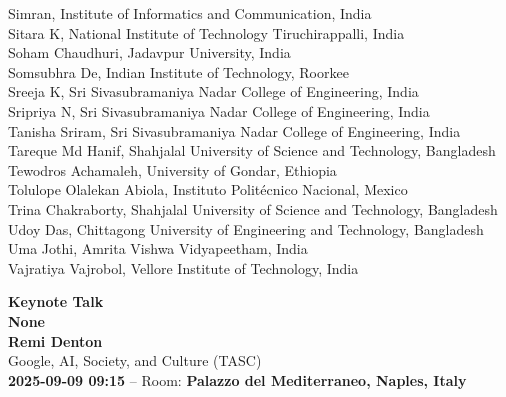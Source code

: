\documentclass[11pt,oneside]{book}
\begin{document}
\begin{description}
              Simran, Institute of Informatics and Communication, India\\
              Sitara K, National Institute of Technology Tiruchirappalli, India\\
              Soham Chaudhuri, Jadavpur University, India\\
              Somsubhra De, Indian Institute of Technology, Roorkee\\
              Sreeja K, Sri Sivasubramaniya Nadar College of Engineering, India\\
              Sripriya N, Sri Sivasubramaniya Nadar College of Engineering, India\\
              Tanisha Sriram, Sri Sivasubramaniya Nadar College of Engineering, India\\
              Tareque Md Hanif, Shahjalal University of Science and Technology, Bangladesh\\
              Tewodros Achamaleh, University of Gondar, Ethiopia\\
              Tolulope Olalekan Abiola, Instituto Politécnico Nacional, Mexico\\
              Trina Chakraborty, Shahjalal University of Science and Technology, Bangladesh\\
              Udoy Das, Chittagong University of Engineering and Technology, Bangladesh\\
              Uma Jothi, Amrita Vishwa Vidyapeetham, India\\
              Vajratiya Vajrobol, Vellore Institute of Technology, India\\
\end{description}
\newpage

  \begin{center}
          {\Large \textbf{Keynote Talk}\\}
      {\LARGE \textbf{None}\\}
        \vspace*{0.5cm}
    \textbf{Remi Denton}\\
        Google, AI, Society, and Culture (TASC)\\
        
        
        \textbf{2025-09-09 09:15} -- 
                Room: \textbf{Palazzo del Mediterraneo, Naples, Italy}\\
        
  \end{center}
\end{document}
